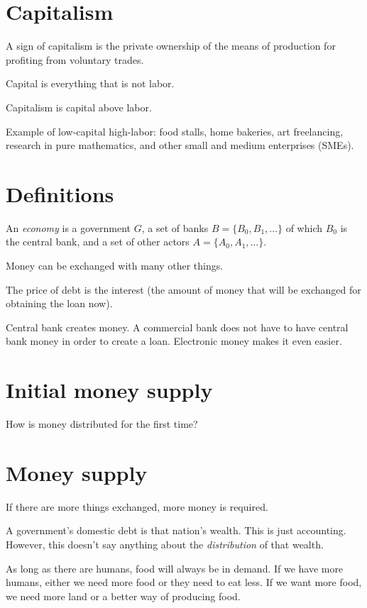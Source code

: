 \section{Capitalism}

A sign of capitalism is the private ownership of the means of production
for profiting from voluntary trades.

Capital is everything that is not labor.

Capitalism is capital above labor.

Example of low-capital high-labor:
food stalls, home bakeries,
art freelancing,
research in pure mathematics,
and other small and medium enterprises (SMEs).

\section{Definitions}

%
An \emph{economy} is a government $G$,
a set of banks $B = \{B_0,B_1,\ldots\}$ of which $B_0$ is the central bank,
and a set of other actors $A = \{A_0,A_1,\ldots\}$.

Money can be exchanged with many other things.

The price of debt is the interest
(the amount of money that will be exchanged for obtaining the loan now).

Central bank creates money.
A commercial bank does not have to have
central bank money in order to create a loan.
Electronic money makes it even easier.

\section{Initial money supply}

How is money distributed for the first time?

\section{Money supply}

If there are more things exchanged, more money is required.

A government's domestic debt is that nation's wealth.
This is just accounting.
However, this doesn't say anything about the \emph{distribution}
of that wealth.

As long as there are humans, food will always be in demand.
If we have more humans, either we need more food or they need to eat less.
If we want more food, we need more land or a better way of producing food.

